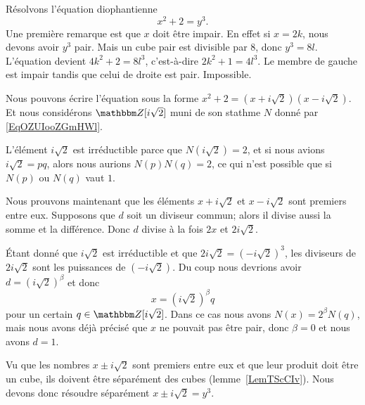 \begin{example}     \label{ExmuQisZU}
    Résolvons l'équation diophantienne
    \begin{equation}
        x^2+2=y^3.
    \end{equation}
    Une première remarque est que \( x\) doit être impair. En effet si \( x=2k\), nous devons avoir \( y^3\) pair. Mais un cube pair est divisible par \( 8\), donc \( y^3=8l\). L'équation devient \( 4k^2+2=8l^3\), c'est-à-dire \( 2k^2+1=4l^3\). Le membre de gauche est impair tandis que celui de droite est pair. Impossible.

    Nous pouvons écrire l'équation sous la forme \( x^2+2=(x+i\sqrt{2})(x-i\sqrt{2})\). Et nous considérons \( \eZ[i\sqrt{2}]\) muni de son stathme \( N\) donné par \eqref{EqOZUIooZGmHWl}.

    L'élément \( i\sqrt{2}\) est irréductible parce que \( N(i\sqrt{2})=2\), et si nous avions \( i\sqrt{2}=pq\), alors nous aurions \( N(p)N(q)=2\), ce qui n'est possible que si \( N(p)\) ou \( N(q)\) vaut \( 1\).

    Nous prouvons maintenant que les éléments \( x+i\sqrt{2}\) et \( x-i\sqrt{2}\) sont premiers entre eux. Supposons que \( d\) soit un diviseur commun; alors il divise aussi la somme et la différence. Donc \( d\) divise à la fois \( 2x\) et \( 2i\sqrt{2}\).

    Étant donné que \( i\sqrt{2}\) est irréductible et que \( 2i\sqrt{2}=(-i\sqrt{2})^3\), les diviseurs de \( 2i\sqrt{2}\) sont les puissances de \( (-i\sqrt{2})\). Du coup nous devrions avoir \( d=(i\sqrt{2})^{\beta}\) et donc
    \begin{equation}
        x=(i\sqrt{2})^{\beta}q
    \end{equation}
    pour un certain \( q\in\eZ[i\sqrt{2}]\). Dans ce cas nous avons \( N(x)=2^{\beta}N(q)\), mais nous avons déjà précisé que \( x\) ne pouvait pas être pair, donc \( \beta=0\) et nous avons \( d=1\).

    Vu que les nombres \( x\pm i\sqrt{2}\) sont premiers entre eux et que leur produit doit être un cube, ils doivent être séparément des cubes (lemme~\ref{LemTScCIv}). Nous devons donc résoudre séparément \( x\pm i\sqrt{2}=y^3\).


\end{example}

